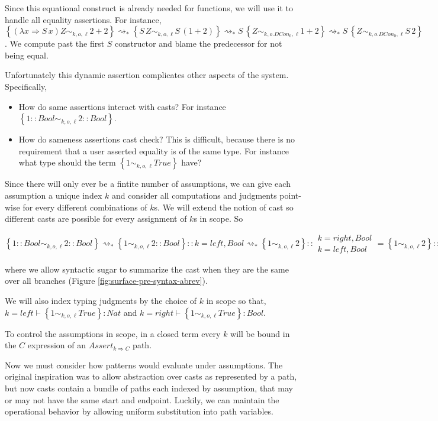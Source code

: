 Since this equational construct is already needed for functions, we
will use it to handle all equality assertions. For instance, $\left\{ \left(\lambda x\Rightarrow S\,x\right)Z\sim_{k,o,\ell}2+2\right\} \rightsquigarrow_{*}\left\{ S\,Z\sim_{k,o,\ell}S\,\left(1+2\right)\right\} \rightsquigarrow_{*}S\,\left\{ Z\sim_{k,o.DCon_{0},\ell}1+2\right\} \rightsquigarrow_{*}S\,\left\{ Z\sim_{k,o.DCon_{0},\ell}S\,2\right\} $.
We compute past the first $S$ constructor and blame the predecessor
for not being equal.

Unfortunately this dynamic assertion complicates other aspects of
the system. Specifically, 
\begin{itemize}
\item How do same assertions interact with casts? For instance $\left\{ 1::Bool\sim_{k,o,\ell}2::Bool\right\} $. 
\item How do sameness assertions cast check? This is difficult, because
there is no requirement that a user asserted equality is of the same
type. For instance what type should the term $\left\{ 1\sim_{k,o,\ell}True\right\} $
have?
\end{itemize}
Since there will only ever be a fintite number of assumptions, we
can give each assumption a unique index $k$ and consider all computations
and judgments point-wise for every different combinations of $k$s.
We will extend the notion of cast so different casts are possible
for every assignment of $k$s in scope. So 

$\left\{ 1::Bool\sim_{k,o,\ell}2::Bool\right\} \rightsquigarrow_{*}\left\{ 1\sim_{k,o,\ell}2::Bool\right\} ::k=left,Bool\rightsquigarrow_{*}\left\{ 1\sim_{k,o,\ell}2\right\} ::\begin{array}{c}
k=right,Bool\\
k=left,Bool
\end{array}=\left\{ 1\sim_{k,o,\ell}2\right\} ::Bool$ 

where we allow syntactic sugar to summarize the cast when they are
the same over all branches (Figure \ref{fig:surface-pre-syntax-abrev}).

We will also index typing judgments by the choice of $k$ in scope
so that, $k=left\vdash\left\{ 1\sim_{k,o,\ell}True\right\} :Nat$
and $k=right\vdash\left\{ 1\sim_{k,o,\ell}True\right\} :Bool$.

To control the assumptions in scope, in a closed term every $k$ will
be bound in the $C$ expression of an $Assert_{k\Rightarrow C}$ path.

Now we must consider how patterns would evaluate under assumptions.
The original inspiration was to allow abstraction over casts as represented
by a path, but now casts contain a bundle of paths each indexed by
assumption, that may or may not have the same start and endpoint.
Luckily, we can maintain the operational behavior by allowing uniform
substitution into path variables.

